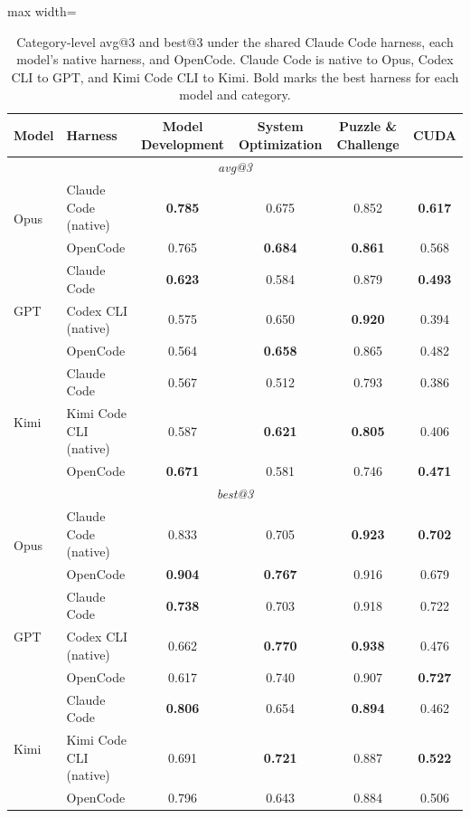 
\begin{table}[t]
\centering
\footnotesize
\setlength{\tabcolsep}{3pt}
\caption{Category-level avg@3 and best@3 under the shared Claude Code harness, each model's native harness, and OpenCode. Claude Code is native to Opus, Codex CLI to GPT, and Kimi Code CLI to Kimi. Bold marks the best harness for each model and category.}
\label{tab:harness_comparison_category}
\begin{adjustbox}{max width=\columnwidth}
\begin{tabular}{llcccc}
\toprule
Model & Harness & Model Development & System Optimization & Puzzle \& Challenge & CUDA \\
\midrule
\multicolumn{6}{c}{\textit{avg@3}} \\
\midrule
\multirow{2}{*}{Opus} & Claude Code (native) & \textbf{0.785} & 0.675 & 0.852 & \textbf{0.617} \\
 & OpenCode & 0.765 & \textbf{0.684} & \textbf{0.861} & 0.568 \\
\midrule
\multirow{3}{*}{GPT} & Claude Code & \textbf{0.623} & 0.584 & 0.879 & \textbf{0.493} \\
 & Codex CLI (native) & 0.575 & 0.650 & \textbf{0.920} & 0.394 \\
 & OpenCode & 0.564 & \textbf{0.658} & 0.865 & 0.482 \\
\midrule
\multirow{3}{*}{Kimi} & Claude Code & 0.567 & 0.512 & 0.793 & 0.386 \\
 & Kimi Code CLI (native) & 0.587 & \textbf{0.621} & \textbf{0.805} & 0.406 \\
 & OpenCode & \textbf{0.671} & 0.581 & 0.746 & \textbf{0.471} \\
\midrule
\multicolumn{6}{c}{\textit{best@3}} \\
\midrule
\multirow{2}{*}{Opus} & Claude Code (native) & 0.833 & 0.705 & \textbf{0.923} & \textbf{0.702} \\
 & OpenCode & \textbf{0.904} & \textbf{0.767} & 0.916 & 0.679 \\
\midrule
\multirow{3}{*}{GPT} & Claude Code & \textbf{0.738} & 0.703 & 0.918 & 0.722 \\
 & Codex CLI (native) & 0.662 & \textbf{0.770} & \textbf{0.938} & 0.476 \\
 & OpenCode & 0.617 & 0.740 & 0.907 & \textbf{0.727} \\
\midrule
\multirow{3}{*}{Kimi} & Claude Code & \textbf{0.806} & 0.654 & \textbf{0.894} & 0.462 \\
 & Kimi Code CLI (native) & 0.691 & \textbf{0.721} & 0.887 & \textbf{0.522} \\
 & OpenCode & 0.796 & 0.643 & 0.884 & 0.506 \\
\bottomrule
\end{tabular}
\end{adjustbox}
\end{table}
